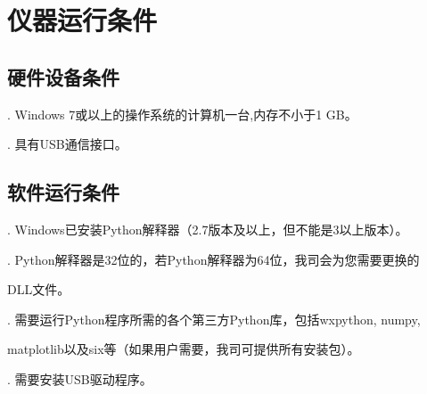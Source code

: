 \chapter{\heiti 仪器运行条件}
\section{\heiti 硬件设备条件}
. Windows 7或以上的操作系统的计算机一台,内存不小于1 GB。

. 具有USB通信接口。

\section{\heiti 软件运行条件}
. Windows已安装Python解释器（2.7版本及以上，但不能是3以上版本）。

. Python解释器是32位的，若Python解释器为64位，我司会为您需要更换的

\hspace{-1em}DLL文件。

. 需要运行Python程序所需的各个第三方Python库，包括wxpython, numpy, 

\hspace{-1em}matplotlib以及six等（如果用户需要，我司可提供所有安装包）。

. 需要安装USB驱动程序。
